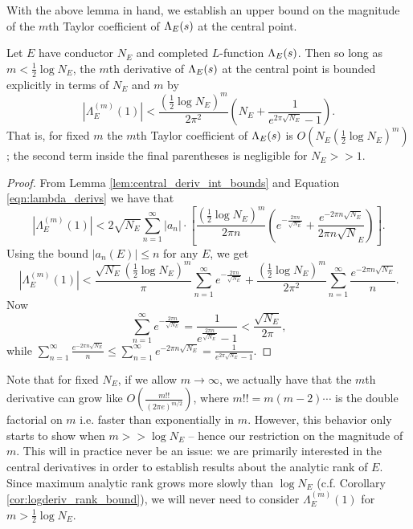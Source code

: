 With the above lemma in hand, we establish an upper bound on the magnitude of the $m$th Taylor coefficient of $\Lambda_E(s)$ at the central point.
\begin{proposition}\label{prop:central_deriv_bounds}
Let $E$ have conductor $N_E$ and completed $L$-function $\Lambda_E(s)$. Then so long as $m<\frac{1}{2}\log N_E$, the $m$th derivative of $\Lambda_E(s)$ at the central point is bounded explicitly in terms of $N_E$ and $m$ by
\begin{equation}
\left| \Lambda_E^{(m)}(1)\right| < \frac{(\frac{1}{2}\log N_E)^m}{2\pi^2}\left(N_E + \frac{1}{e^{2\pi\sqrt{N_E}}-1} \right).
\end{equation}
That is, for fixed $m$ the $m$th Taylor coefficient of $\Lambda_E(s)$ is $O\left( N_E(\frac{1}{2}\log N_E)^m\right)$; the second term inside the final parentheses is negligible for $N_E>>1$.
\end{proposition}

\begin{proof}
From Lemma \ref{lem:central_deriv_int_bounds} and Equation \ref{eqn:lambda_derivs} we have that
\begin{equation*}
\left| \Lambda_E^{(m)}(1)\right| < 2 \sqrt{N_E} \sum_{n=1}^{\infty} |a_n| \cdot \left[\frac{\left(\frac{1}{2} \log N_E\right)^{m}}{2\pi n}\left( e^{-\frac{2\pi n}{\sqrt{N_E}}} + \frac{e^{-2\pi n\sqrt{N_E}}}{2\pi n \sqrt N_E} \right)\right].
\end{equation*}
Using the bound $|a_n(E)| \le n$ for any $E$, we get
\begin{equation*}
\left| \Lambda_E^{(m)}(1)\right| < \frac{ \sqrt{N_E}\left(\frac{1}{2} \log N_E\right)^{m}}{\pi} \sum_{n=1}^{\infty} e^{-\frac{2\pi n}{\sqrt{N_E}}} + \frac{\left(\frac{1}{2} \log N_E\right)^{m}}{2\pi^2} \sum_{n=1}^{\infty} \frac{e^{-2\pi n\sqrt{N_E}}}{n}.
\end{equation*}
Now
\begin{equation*}
\sum_{n=1}^{\infty} e^{-\frac{2\pi n}{\sqrt{N_E}}} = \frac{1}{e^{\frac{2\pi n}{\sqrt{N_E}}}-1}< \frac{\sqrt{N_E}}{2\pi},
\end{equation*}
while $\sum_{n=1}^{\infty} \frac{e^{-2\pi n\sqrt{N_E}}}{n} \le \sum_{n=1}^{\infty} e^{-2\pi n\sqrt{N_E}} = \frac{1}{e^{2\pi\sqrt{N_E}}-1}$.
\end{proof}

Note that for fixed $N_E$, if we allow $m \to \infty$, we actually have that the $m$th derivative can grow like $O\left(\frac{m!!}{(2\pi e)^{m/2}}\right)$, where $m!! = m(m-2)\cdots$ is the double factorial on $m$ i.e. faster than exponentially in $m$. However, this behavior only starts to show when $m>>\log N_E$ -- hence our restriction on the magnitude of $m$. This will in practice never be an issue: we are primarily interested in the central derivatives in order to establish results about the analytic rank of $E$. Since maximum analytic rank grows more slowly than $\log N_E$ (c.f. Corollary \ref{cor:logderiv_rank_bound}), we will never need to consider $\Lambda_E^{(m)}(1)$ for $m> \frac{1}{2}\log N_E$. \\


